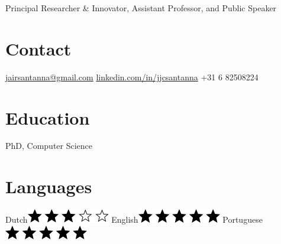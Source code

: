 \documentclass[print]{styles/friggeri-cv-mac} %
\begin{document}
{Principal Researcher \& Innovator, Assistant Professor, and Public Speaker} 
\begin{aside} 
 \section{Contact}
\href{mailto:jairsantanna@gmail.com}{jairsantanna@gmail.com}
\href{https://www.linkedin.com/in/jjcsantanna}{linkedin.com/in/jjcsantanna}
+31 6 82508224
~
\section{Education}\hspace{-1cm}
PhD, Computer Science
~
\section{Languages}
Dutch\includegraphics[scale=0.40]{img/3stars.png}
English\includegraphics[scale=0.40]{img/5stars.png}
Portuguese\includegraphics[scale=0.40]{img/5stars.png}
\end{aside}
\end{document}
